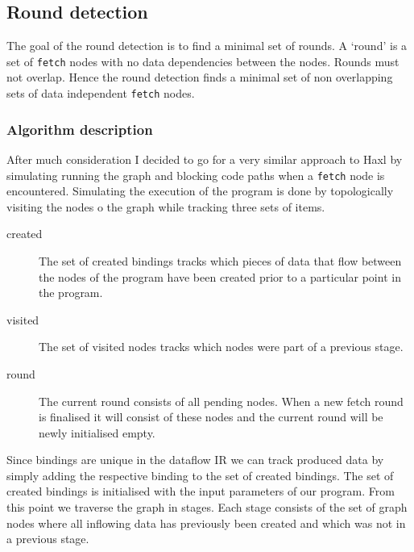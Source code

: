 \subsection{Round detection}

The goal of the round detection is to find a minimal set of rounds.
A `round' is a set of \texttt{fetch} nodes with no data dependencies between the nodes.
Rounds must not overlap.
Hence the round detection finds a minimal set of non overlapping sets of data independent \texttt{fetch} nodes.

\subsubsection{Algorithm description}

After much consideration I decided to go for a very similar approach to Haxl by simulating running the graph and blocking code paths when a \texttt{fetch} node is encountered.
Simulating the execution of the program is done by topologically visiting the nodes o the graph while tracking three sets of items.

\begin{description}
	\item[created] The set of created bindings tracks which pieces of data that flow between the nodes of the program have been created prior to a particular point in the program.
	\item[visited] The set of visited nodes tracks which nodes were part of a previous stage.
	\item[round] The current round consists of all pending \fetch{} nodes.
	When a new fetch round is finalised it will consist of these \fetch{} nodes and the current round will be newly initialised empty.
\end{description}

Since bindings are unique in the dataflow IR we can track produced data by simply adding the respective binding to the set of created bindings.
The set of created bindings is initialised with the input parameters of our program.
From this point we traverse the graph in stages.
Each stage consists of the set of graph nodes where all inflowing data has previously been created and which was not in a previous stage.

